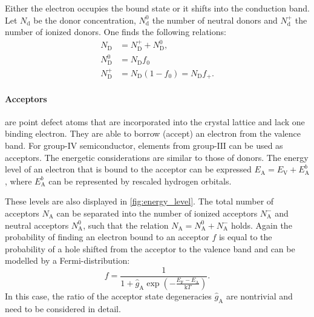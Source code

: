 Either the electron occupies the bound state or it shifts into the
conduction band.
Let $N_\mathrm{d}$ be the donor concentration, $N_\mathrm{d}^0$ the
number of neutral donors and $N_\mathrm{d}^+$ the number of ionized donors.
One finds the following relations:
\begin{align}
	N_{\mathrm{D}}     & =N_{\mathrm{D}}^{+}+N_{\mathrm{D}}^{0},        \\
	N_{\mathrm{D}}^{0} & =N_{\mathrm{D}}f_0                             \\
	\label{eq:ndplus}
	N_{\mathrm{D}}^{+} & =N_{\mathrm{D}}(1-f_{0}) =N_{\mathrm{D}}f_{+}.
\end{align}

\paragraph{Acceptors} are point defect atoms that are incorporated
into the crystal
lattice and lack one binding electron.
They are able to borrow (accept) an electron from the valence band.
For group-$\mathrm{IV}$ semiconductor, elements from group-$\mathrm{III}$
can be used as acceptors.
The energetic considerations are similar to those of donors.
The energy level of an electron that is bound to the acceptor can be
expressed
$E_{\mathrm{A}}=E_{\mathrm{V}}+E_{\mathrm{A}}^{b}$,
where $E_\mathrm{A}^b$ can be represented by rescaled
hydrogen orbitals.

These levels are also displayed in \cref{fig:energy_level}.
The total number of acceptors $N_\mathrm{A}$ can be separated into
the number of ionized acceptors $N_\mathrm{A}^-$ and neutral
acceptors $N_\mathrm{A}^0$, such that the relation
$N_{\mathrm{A}}=N_{\mathrm{A}}^{0}+N_{\mathrm{A}}^{-}$ holds.
Again the probability of finding an electron bound to an acceptor $f$ is
equal to the probability of a hole shifted from the acceptor to the
valence band and can be modelled by a Fermi-distribution:
\begin{equation}
	f = \frac{1}{1+\hat{g}_{\mathrm{A}}\exp\left( -
	\frac{E_{\mathrm{F}}-E_{\mathrm{A}}}{\mathrm{k}T} \right)}.
\end{equation}
In this case, the ratio of the acceptor state degeneracies
$\hat{g}_\mathrm{A}$ are nontrivial and need to be considered in detail.

